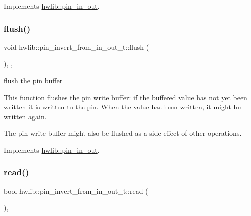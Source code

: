 Implements \hyperlink{classhwlib_1_1pin__in__out_ad08a5f5e9a4c3aadaa7c665b98f2418e}{hwlib\+::pin\+\_\+in\+\_\+out}.

\mbox{\label{classhwlib_1_1pin__invert__from__in__out__t_ab8eefcc2f37559eb78935a72bcdd32ae}} 
\subsubsection{\texorpdfstring{flush()}{flush()}}
{\footnotesize\ttfamily void hwlib\+::pin\+\_\+invert\+\_\+from\+\_\+in\+\_\+out\+\_\+t\+::flush (\begin{DoxyParamCaption}{ }\end{DoxyParamCaption})\hspace{0.3cm}{\ttfamily [inline]}, {\ttfamily [override]}, {\ttfamily [virtual]}}

flush the pin buffer

This function flushes the pin write buffer\+: if the buffered value has not yet been written it is written to the pin. When the value has been written, it might be written again.

The pin write buffer might also be flushed as a side-\/effect of other operations. 

Implements \hyperlink{classhwlib_1_1pin__in__out_a5207c9e30f0c88e4c052952397c2da88}{hwlib\+::pin\+\_\+in\+\_\+out}.

\mbox{\label{classhwlib_1_1pin__invert__from__in__out__t_a36432019f4ab69ea26255b70641599bd}} 
\subsubsection{\texorpdfstring{read()}{read()}}
{\footnotesize\ttfamily bool hwlib\+::pin\+\_\+invert\+\_\+from\+\_\+in\+\_\+out\+\_\+t\+::read (\begin{DoxyParamCaption}{ }\end{DoxyParamCaption})\hspace{0.3cm}{\ttfamily [inline]}, {\ttfamily [virtual]}}

